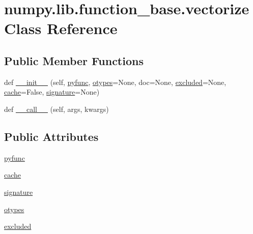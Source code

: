 \hypertarget{classnumpy_1_1lib_1_1function__base_1_1vectorize}{}\section{numpy.\+lib.\+function\+\_\+base.\+vectorize Class Reference}
\label{classnumpy_1_1lib_1_1function__base_1_1vectorize}
\subsection*{Public Member Functions}
\begin{DoxyCompactItemize}
\item 
def \hyperlink{classnumpy_1_1lib_1_1function__base_1_1vectorize_aa40dfbdda34cdfa88f36c391a855e570}{\+\_\+\+\_\+init\+\_\+\+\_\+} (self, \hyperlink{classnumpy_1_1lib_1_1function__base_1_1vectorize_a9ba37686f9c887a21fedee2873950d18}{pyfunc}, \hyperlink{classnumpy_1_1lib_1_1function__base_1_1vectorize_aceb5282a6f6c3ccbecae8a9c4ef8c43e}{otypes}=None, doc=None, \hyperlink{classnumpy_1_1lib_1_1function__base_1_1vectorize_a5829ff4804df5dc8841ae169b3ed5daf}{excluded}=None, \hyperlink{classnumpy_1_1lib_1_1function__base_1_1vectorize_ac0abfa29fabd51edd16c71dbcf11a0b0}{cache}=False, \hyperlink{classnumpy_1_1lib_1_1function__base_1_1vectorize_a42b785e898731a232fb1c35125310265}{signature}=None)
\item 
def \hyperlink{classnumpy_1_1lib_1_1function__base_1_1vectorize_a015d37bbbc3eaa61e429c523f00a6c84}{\+\_\+\+\_\+call\+\_\+\+\_\+} (self, args, kwargs)
\end{DoxyCompactItemize}
\subsection*{Public Attributes}
\begin{DoxyCompactItemize}
\item 
\hyperlink{classnumpy_1_1lib_1_1function__base_1_1vectorize_a9ba37686f9c887a21fedee2873950d18}{pyfunc}
\item 
\hyperlink{classnumpy_1_1lib_1_1function__base_1_1vectorize_ac0abfa29fabd51edd16c71dbcf11a0b0}{cache}
\item 
\hyperlink{classnumpy_1_1lib_1_1function__base_1_1vectorize_a42b785e898731a232fb1c35125310265}{signature}
\item 
\hyperlink{classnumpy_1_1lib_1_1function__base_1_1vectorize_aceb5282a6f6c3ccbecae8a9c4ef8c43e}{otypes}
\item 
\hyperlink{classnumpy_1_1lib_1_1function__base_1_1vectorize_a5829ff4804df5dc8841ae169b3ed5daf}{excluded}
\end{DoxyCompactItemize}


